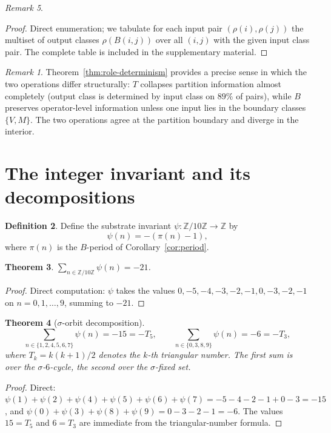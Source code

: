 \documentclass[submission,copyright,creativecommons]{eptcs}
\theoremstyle{plain}
\newtheorem{theorem}{Theorem}
\theoremstyle{definition}
\newtheorem{definition}[theorem]{Definition}
\theoremstyle{remark}
\newtheorem{remark}[theorem]{Remark}
\begin{document}
\begin{remark}
\begin{proof}
Direct enumeration; we tabulate for each input pair $(\rho(i), \rho(j))$
the multiset of output classes $\rho(B(i, j))$ over all $(i, j)$ with the
given input class pair. The complete table is included in the supplementary
material.
\end{proof}

\begin{remark}
Theorem~\ref{thm:role-determinism} provides a precise sense in which the
two operations differ structurally: $T$ collapses partition information
almost completely (output class is determined by input class on $89\%$ of
pairs), while $B$ preserves operator-level information unless one input
lies in the boundary classes $\{V, M\}$. The two operations agree at the
partition boundary and diverge in the interior.
\end{remark}

\section{The integer invariant and its decompositions}\label{sec:invariant}

\begin{definition}\label{def:psi}
Define the substrate invariant $\psi : \mathbb{Z}/10\mathbb{Z} \to \mathbb{Z}$ by
\[
\psi(n) = -(\pi(n) - 1),
\]
where $\pi(n)$ is the $B$-period of Corollary~\ref{cor:period}.
\end{definition}

\begin{theorem}\label{thm:invariant}
$\sum_{n \in \mathbb{Z}/10\mathbb{Z}} \psi(n) = -21$.
\end{theorem}

\begin{proof}
Direct computation: $\psi$ takes the values $0, -5, -4, -3, -2, -1, 0, -3,
-2, -1$ on $n = 0, 1, \dots, 9$, summing to $-21$.
\end{proof}

\begin{theorem}[$\sigma$-orbit decomposition]\label{thm:triangular}
\[
\sum_{n \in \{1,2,4,5,6,7\}} \psi(n) = -15 = -T_5,
\qquad
\sum_{n \in \{0, 3, 8, 9\}} \psi(n) = -6 = -T_3,
\]
where $T_k = k(k+1)/2$ denotes the $k$-th triangular number. The first sum
is over the $\sigma$-$6$-cycle, the second over the $\sigma$-fixed set.
\end{theorem}

\begin{proof}
Direct: $\psi(1) + \psi(2) + \psi(4) + \psi(5) + \psi(6) + \psi(7) =
-5 - 4 - 2 - 1 + 0 - 3 = -15$, and $\psi(0) + \psi(3) + \psi(8) + \psi(9) =
0 - 3 - 2 - 1 = -6$. The values $15 = T_5$ and $6 = T_3$ are immediate
from the triangular-number formula.
\end{proof}


\end{remark}
\end{document}
